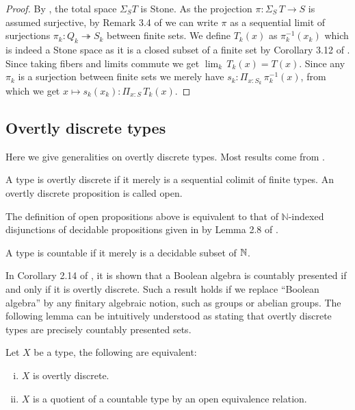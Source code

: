 \begin{proof}
  By , the total space $\Sigma_S T$ is Stone. As the projection $\pi: \Sigma_S\, T \to S$ is  assumed surjective, by Remark 3.4 of \cite{synthetic-stone-duality} 
we can write $\pi$ as a sequential limit of surjections $\pi_k : Q_k\twoheadrightarrow S_k$ between finite sets. 
We define $T_k(x)$ as $\pi_k^{-1}(x_k)$ which is indeed a Stone space as it is a closed subset of a finite set by Corollary 3.12 of \cite{synthetic-stone-duality}.
%  
  Since taking fibers and limits commute we get $\lim_k\, T_k(x) = T(x)$.
%  
  Since any $\pi_k$ is a surjection between finite sets we merely have $s_k: \Pi_{x:S_k}\, \pi_k^{-1}(x)$, 
  from which we get $x\mapsto s_k(x_k) : \Pi_{x :S}\, T_k(x)$. 
\end{proof}



\subsection{Overtly discrete types}
\label{overtly-discrete-types}

Here we give generalities on overtly discrete types. Most results come from \cite{synthetic-stone-duality}.

\begin{definition}\label{dfnODisc}
A type is overtly discrete if it merely is a sequential colimit of finite types.
An overtly discrete proposition is called open. 
\end{definition}
\begin{remark}
  The definition of open propositions above is equivalent to that of $\mathbb N$-indexed disjunctions of decidable propositions given in \cite{synthetic-stone-duality} by Lemma 2.8 of \cite{synthetic-stone-duality}. 
\end{remark}

\begin{definition}
A type is countable if it merely is a decidable subset of $\mathbb{N}$.
\end{definition}

\begin{remark}\label{overtly-discrete-countably-presented}
  In Corollary 2.14 of \cite{synthetic-stone-duality}, it is shown that a Boolean algebra is countably presented if and only if it is overtly discrete. Such a result holds if we replace ``Boolean algebra'' by any finitary algebraic notion, such as groups or abelian groups. The following lemma can be intuitively understood as stating that overtly discrete types are precisely countably presented sets. 
\end{remark}
\begin{lemma}\label{overtly-discrete-colimit-finite}
Let $X$ be a type, the following are equivalent:

\begin{enumerate}[(i)]
\item $X$ is overtly discrete.
\item $X$ is a quotient of a countable type by an open equivalence relation.
\end{enumerate}
\end{lemma}

